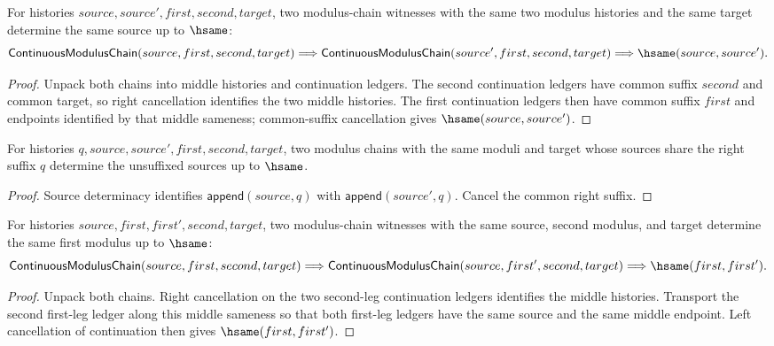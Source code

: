 \begin{theorem}
\label{thm:continuous-modulus-chain-source-deterministic}
For histories $source,source',first,second,target$, two modulus-chain witnesses
with the same two modulus histories and the same target determine the same
source up to $\hsame$:
$$
\mathsf{ContinuousModulusChain}(source,first,second,target)
\Longrightarrow
\mathsf{ContinuousModulusChain}(source',first,second,target)
\Longrightarrow
\hsame(source,source').
$$
\end{theorem}
\begin{proof}
Unpack both chains into middle histories and continuation ledgers. The second
continuation ledgers have common suffix $second$ and common target, so right
cancellation identifies the two middle histories. The first continuation
ledgers then have common suffix $first$ and endpoints identified by that middle
sameness; common-suffix cancellation gives $\hsame(source,source')$.
\end{proof}

\begin{theorem}
\label{thm:continuous-modulus-chain-append-suffix-source-deterministic}
For histories $q,source,source',first,second,target$, two modulus chains with
the same moduli and target whose sources share the right suffix $q$ determine
the unsuffixed sources up to $\hsame$.
\end{theorem}
\begin{proof}
Source determinacy identifies $\mathsf{append}(source,q)$ with
$\mathsf{append}(source',q)$. Cancel the common right suffix.
\end{proof}

\begin{theorem}
\label{thm:continuous-modulus-chain-first-deterministic}
For histories $source,first,first',second,target$, two modulus-chain witnesses
with the same source, second modulus, and target determine the same first
modulus up to $\hsame$:
$$
\mathsf{ContinuousModulusChain}(source,first,second,target)
\Longrightarrow
\mathsf{ContinuousModulusChain}(source,first',second,target)
\Longrightarrow
\hsame(first,first').
$$
\end{theorem}
\begin{proof}
Unpack both chains. Right cancellation on the two second-leg continuation
ledgers identifies the middle histories. Transport the second first-leg ledger
along this middle sameness so that both first-leg ledgers have the same source
and the same middle endpoint. Left cancellation of continuation then gives
$\hsame(first,first')$.
\end{proof}

